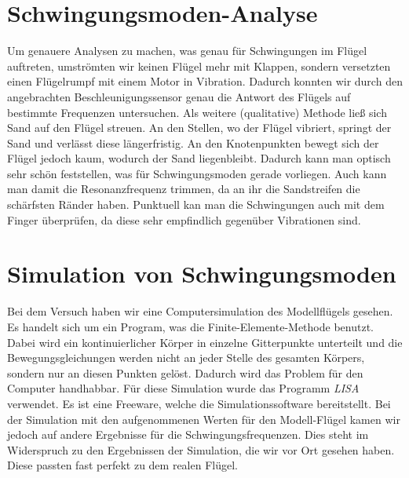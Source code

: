 \documentclass[12pt,a4paper,titlepage,headinclude,bibtotoc]{scrartcl}
\begin{document}
\section{Schwingungsmoden-Analyse}
Um genauere Analysen zu machen, was genau für Schwingungen im Flügel auftreten, umströmten wir keinen Flügel mehr mit Klappen, sondern versetzten einen Flügelrumpf mit einem Motor in Vibration.
Dadurch konnten wir durch den angebrachten Beschleunigungssensor genau die Antwort des Flügels auf bestimmte Frequenzen untersuchen.
Als weitere (qualitative) Methode ließ sich Sand auf den Flügel streuen.
An den Stellen, wo der Flügel vibriert, springt der Sand und verlässt diese längerfristig.
An den Knotenpunkten bewegt sich der Flügel jedoch kaum, wodurch der Sand liegenbleibt.
Dadurch kann man optisch sehr schön feststellen, was für Schwingungsmoden gerade vorliegen.
Auch kann man damit die Resonanzfrequenz trimmen, da an ihr die Sandstreifen die schärfsten Ränder haben.
Punktuell kan man die Schwingungen auch mit dem Finger überprüfen, da diese sehr empfindlich gegenüber Vibrationen sind.

\section{Simulation von Schwingungsmoden}
Bei dem Versuch haben wir eine Computersimulation des Modellflügels gesehen.
Es handelt sich um ein Program, was die Finite-Elemente-Methode benutzt.
Dabei wird ein kontinuierlicher Körper in einzelne Gitterpunkte unterteilt und die Bewegungsgleichungen werden nicht an jeder Stelle des gesamten Körpers, sondern nur an diesen Punkten gelöst.
Dadurch wird das Problem für den Computer handhabbar.
Für diese Simulation wurde das Programm \textit{LISA} verwendet.
Es ist eine Freeware, welche die Simulationssoftware bereitstellt.
Bei der Simulation mit den aufgenommenen Werten für den Modell-Flügel kamen wir jedoch auf andere Ergebnisse für die Schwingungsfrequenzen.
Dies steht im Widerspruch zu den Ergebnissen der Simulation, die wir vor Ort gesehen haben.
Diese passten fast perfekt zu dem realen Flügel.
\end{document}
